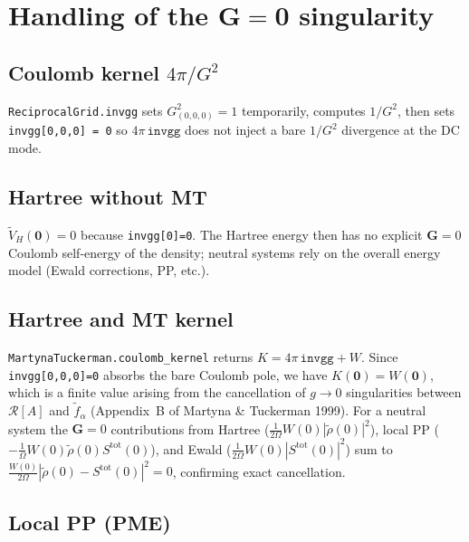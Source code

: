 \documentclass[11pt,a4paper]{article}
\begin{document}
\section{Handling of the $\mathbf G=\mathbf 0$ singularity}
\label{sec:g0}

\subsection{Coulomb kernel $4\pi/G^2$}

\texttt{ReciprocalGrid.invgg} sets $G^2_{(0,0,0)}=1$ temporarily, computes $1/G^2$,
then sets \texttt{invgg[0,0,0] = 0} so $4\pi\,\texttt{invgg}$ does not inject a bare
$1/G^2$ divergence at the DC mode.

\subsection{Hartree without MT}

$\tilde V_H(\mathbf 0)=0$ because \texttt{invgg[0]=0}. The Hartree energy then has no
explicit $\mathbf G=0$ Coulomb self-energy of the density; neutral systems rely on the
overall energy model (Ewald corrections, PP, etc.).

\subsection{Hartree and MT kernel}

\texttt{MartynaTuckerman.coulomb\_kernel} returns
$K = 4\pi\,\texttt{invgg} + W$.
Since \texttt{invgg[0,0,0]=0} absorbs the bare Coulomb pole, we have
$K(\mathbf 0) = W(\mathbf 0)$, which is a finite value arising from the
cancellation of $g\to 0$ singularities between $\mathcal{R}[A]$ and $\tilde f_\alpha$
(Appendix~B of Martyna \& Tuckerman 1999).  For a neutral system the $\mathbf G=0$
contributions from Hartree ($\frac{1}{2\Omega}W(0)|\tilde\rho(0)|^2$), local PP
($-\frac{1}{\Omega}W(0)\tilde\rho(0)S^{\mathrm{tot}}(0)$), and Ewald
($\frac{1}{2\Omega}W(0)|S^{\mathrm{tot}}(0)|^2$) sum to
$\frac{W(0)}{2\Omega}|\tilde\rho(0)-S^{\mathrm{tot}}(0)|^2 = 0$, confirming exact cancellation.

\subsection{Local PP (PME)}
\end{document}
